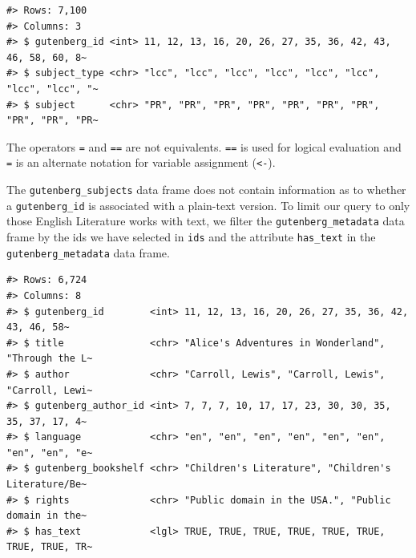 \documentclass[
  letterpaper,
]{latex/krantz}
\newenvironment{Shaded}{\begin{snugshade}}{\end{snugshade}}
\newcommand{\CommentTok}[1]{\textcolor[rgb]{0.37,0.37,0.37}{#1}}
\newcommand{\ConstantTok}[1]{\textcolor[rgb]{0.56,0.35,0.01}{#1}}
\newcommand{\FunctionTok}[1]{\textcolor[rgb]{0.28,0.35,0.67}{#1}}
\newcommand{\NormalTok}[1]{\textcolor[rgb]{0.00,0.23,0.31}{#1}}
\newcommand{\OtherTok}[1]{\textcolor[rgb]{0.00,0.23,0.31}{#1}}
\newcommand{\SpecialCharTok}[1]{\textcolor[rgb]{0.37,0.37,0.37}{#1}}
\begin{document}
\begin{verbatim}
#> Rows: 7,100
#> Columns: 3
#> $ gutenberg_id <int> 11, 12, 13, 16, 20, 26, 27, 35, 36, 42, 43, 46, 58, 60, 8~
#> $ subject_type <chr> "lcc", "lcc", "lcc", "lcc", "lcc", "lcc", "lcc", "lcc", "~
#> $ subject      <chr> "PR", "PR", "PR", "PR", "PR", "PR", "PR", "PR", "PR", "PR~
\end{verbatim}

\begin{tcolorbox}[enhanced jigsaw, opacitybacktitle=0.6, breakable, colframe=quarto-callout-warning-color-frame, arc=.35mm, left=2mm, leftrule=.75mm, title=\textcolor{quarto-callout-warning-color}{\faExclamationTriangle}\hspace{0.5em}{Tip}, opacityback=0, colback=white, toptitle=1mm, rightrule=.15mm, titlerule=0mm, bottomtitle=1mm, bottomrule=.15mm, coltitle=black, colbacktitle=quarto-callout-warning-color!10!white, toprule=.15mm]
The operators \texttt{=} and \texttt{==} are not equivalents.
\texttt{==} is used for logical evaluation and \texttt{=} is an
alternate notation for variable assignment (\texttt{\textless{}-}).
\end{tcolorbox}

The \texttt{gutenberg\_subjects} data frame does not contain information
as to whether a \texttt{gutenberg\_id} is associated with a plain-text
version. To limit our query to only those English Literature works with
text, we filter the \texttt{gutenberg\_metadata} data frame by the ids
we have selected in \texttt{ids} and the attribute \texttt{has\_text} in
the \texttt{gutenberg\_metadata} data frame.

\begin{Shaded}
\end{Shaded}

\begin{verbatim}
#> Rows: 6,724
#> Columns: 8
#> $ gutenberg_id        <int> 11, 12, 13, 16, 20, 26, 27, 35, 36, 42, 43, 46, 58~
#> $ title               <chr> "Alice's Adventures in Wonderland", "Through the L~
#> $ author              <chr> "Carroll, Lewis", "Carroll, Lewis", "Carroll, Lewi~
#> $ gutenberg_author_id <int> 7, 7, 7, 10, 17, 17, 23, 30, 30, 35, 35, 37, 17, 4~
#> $ language            <chr> "en", "en", "en", "en", "en", "en", "en", "en", "e~
#> $ gutenberg_bookshelf <chr> "Children's Literature", "Children's Literature/Be~
#> $ rights              <chr> "Public domain in the USA.", "Public domain in the~
#> $ has_text            <lgl> TRUE, TRUE, TRUE, TRUE, TRUE, TRUE, TRUE, TRUE, TR~
\end{verbatim}
\end{document}
